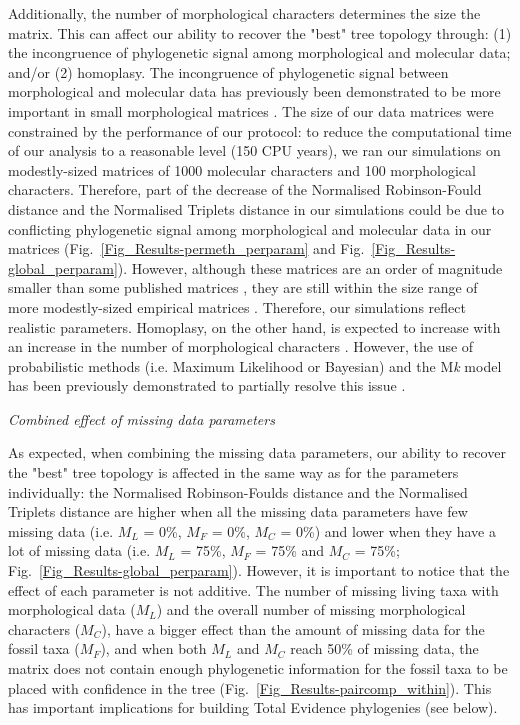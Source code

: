 \documentclass[12pt,letterpaper]{article}
\renewcommand{\subsection}[1]{%
\bigskip
\begin{center}
\begin{large}
\normalfont\itshape #1
\end{large}
\end{center}}
\begin{document}
Additionally, the number of morphological characters determines the size the matrix. This can affect our ability to recover the "best" tree topology through: (1) the incongruence of phylogenetic signal among morphological and molecular data; and/or (2) homoplasy. The incongruence of phylogenetic signal between morphological and molecular data has previously been demonstrated to be more important in small morphological matrices \citep{wagner2000}. The size of our data matrices were constrained by the performance of our protocol: to reduce the computational time of our analysis to a reasonable level (150 CPU years), we ran our simulations on modestly-sized matrices of 1000 molecular characters and 100 morphological characters. Therefore, part of the decrease of the Normalised Robinson-Fould distance and the Normalised Triplets distance in our simulations could be due to conflicting phylogenetic signal among morphological and molecular data in our matrices (Fig.~\ref{Fig_Results-permeth_perparam} and Fig.~\ref{Fig_Results-global_perparam}). However, although these matrices are an order of magnitude smaller than some published matrices \citep[e.g.][]{springermacroevolutionary2012,nithe2013}, they are still within the size range of more modestly-sized empirical matrices \citep[e.g.][]{kellymolecular2014, sallam2011craniodental}. Therefore, our simulations reflect realistic parameters. Homoplasy, on the other hand, is expected to increase with an increase in the number of morphological characters \citep{wrightbayesian2014}. However, the use of probabilistic methods (i.e. Maximum Likelihood or Bayesian) and the M\textit{k} model \citep{lewisa2001} has been previously demonstrated to partially resolve this issue \citep{wrightbayesian2014}.

\subsection{Combined effect of missing data parameters}
As expected, when combining the missing data parameters, our ability to recover the "best" tree topology is affected in the same way as for the parameters individually: the Normalised Robinson-Foulds distance and the Normalised Triplets distance are higher when all the missing data parameters have few missing data (i.e. $M_{L}$ = 0\%, $M_{F}$ = 0\%, $M_{C}$ = 0\%) and lower when they have a lot of missing data (i.e. $M_{L}$ = 75\%, $M_{F}$ = 75\% and $M_{C}$ = 75\%; Fig.~\ref{Fig_Results-global_perparam}). However, it is important to notice that the effect of each parameter is not additive. The number of missing living taxa with morphological data ($M_{L}$) and the overall number of missing morphological characters ($M_{C}$), have a bigger effect than the amount of missing data for the fossil taxa ($M_{F}$), and when both $M_{L}$ and $M_{C}$ reach 50\% of missing data, the matrix does not contain enough phylogenetic information for the fossil taxa to be placed with confidence in the tree (Fig.~\ref{Fig_Results-paircomp_within}). This has important implications for building Total Evidence phylogenies (see below).
\end{document}
